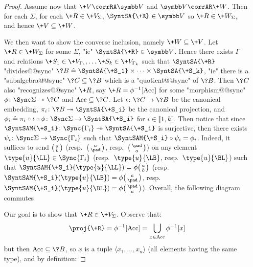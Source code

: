 \begin{proof}
	 Assume now that $\+V \corrRA \B{V}$
	and $\B{V} \corrAR \+W$. Then for each $\Sigma$, for each $\+R \in \+V_{\Sigma}$,
	$\SyntSA{\+R} \in \B{V}$ so $\+R \in \+W_{\Sigma}$, and hence $\+V \subseteq \+W$.

	We then want to show the converse inclusion, namely $\+W \subseteq \+V$. Let $\+R \in \+W_{\Sigma}$ for some $\Sigma$, "ie" $\SyntSA{\+R} \in \B{V}$.
	Hence there exists $\Gamma$ and relations $\+S_1 \in \+V_{\Gamma_1}, \hdots \+S_k \in \+V_{\Gamma_k}$
	such that $\SyntSA{\+R}$ "divides@@sync"
	$\?B \defeq \SyntSA{\+S_1} \times \cdots \times \SyntSA{\+S_k}$,
	"ie" there is a "subalgebra@@sync" $\?C \subseteq \?B$ which is a "quotient@@sync" of $\?B$.
	Then $\?C$ also "recognizes@@sync" $\+R$, say $\+R = \phi^{-1}[\Acc]$ for some
	"morphism@@sync" $\phi\colon \Sync\Sigma \surj \?C$ and $\Acc \subseteq \?C$.
	Let $\iota\colon \?C \to \?B$ be the canonical embedding,
	$\pi_i\colon \?B \surj \SyntSA{\+S_i}$ be the canonical projection,
	and $\phi_i \defeq \pi_i \circ \iota \circ \phi\colon \Sync\Sigma \to \SyntSA{\+S_i}$
	for $i \in \lBrack 1, k\rBrack$. Then notice that since $\SyntSAM{\+S_i}\colon \Sync{\Gamma_i} \surj \SyntSA{\+S_i}$ is surjective, then there exists $\psi_i \colon \Sync\Sigma \to \Sync{\Gamma_i}$ such that $\SyntSAM{\+S_i} \circ \psi_i = \phi_i$. Indeed, it suffices
	to send $\pair{a}{b}$ (resp.~$\pair{a}{\pad}$, resp.~$\pair{\pad}{a}$)
	on any element $\type{u}{\LL} \in \Sync{\Gamma_i}$ (resp.~$\type{u}{\LB}$,
	resp.~$\type{u}{\BL}$) such that $\SyntSAM{\+S_i}(\type{u}{\LL}) = \phi\pair{a}{b}$
	(resp.~$\SyntSAM{\+S_i}(\type{u}{\LB}) = \phi\pair{a}{\pad}$,
	resp.~$\SyntSAM{\+S_i}(\type{u}{\BL}) = \phi\pair{\pad}{a}$). Overall, the following diagram
	commutes
	\begin{center}
	\end{center}
	Our goal is to show that $\+R \in \+V_{\Sigma}$. Observe that:
	\[
		\proj{\+R} =
		\phi^{-1}[\Acc] = \bigcup_{x \in \Acc} \phi^{-1}[x]
	\]
	but then $\Acc \subseteq \?B$, so $x$ is a tuple $\langle x_1, \hdots, x_n \rangle$
	(all elements having the same type), and by definition:

\end{proof}
